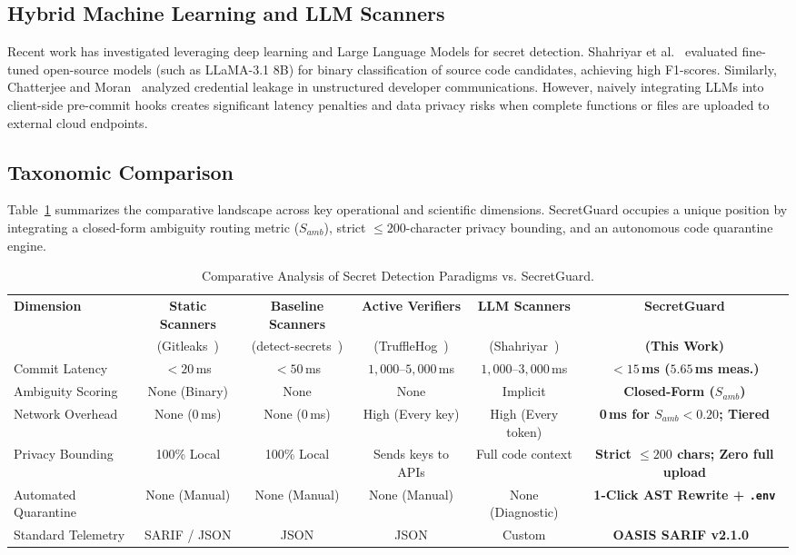 \subsection{Hybrid Machine Learning and LLM Scanners}
Recent work has investigated leveraging deep learning and Large Language Models for secret detection. Shahriyar et al.~\cite{shahriyar2025secret} evaluated fine-tuned open-source models (such as LLaMA-3.1 8B) for binary classification of source code candidates, achieving high F1-scores. Similarly, Chatterjee and Moran~\cite{chatterjee2024secretleak} analyzed credential leakage in unstructured developer communications. However, naively integrating LLMs into client-side pre-commit hooks creates significant latency penalties and data privacy risks when complete functions or files are uploaded to external cloud endpoints.

\subsection{Taxonomic Comparison}
Table~\ref{tab:comparison} summarizes the comparative landscape across key operational and scientific dimensions. SecretGuard occupies a unique position by integrating a closed-form ambiguity routing metric ($S_{amb}$), strict $\le 200$-character privacy bounding, and an autonomous code quarantine engine.

\begin{table}[t]
\centering
\caption{Comparative Analysis of Secret Detection Paradigms vs. SecretGuard.}
\label{tab:comparison}
\small
\begin{tabular}{lccccc}
\toprule
\textbf{Dimension} & \textbf{Static Scanners} & \textbf{Baseline Scanners} & \textbf{Active Verifiers} & \textbf{LLM Scanners} & \textbf{SecretGuard} \\
& (Gitleaks~\cite{rice2018gitleaks}) & (detect-secrets~\cite{yelp2019detectsecrets}) & (TruffleHog~\cite{ayrey2016trufflehog}) & (Shahriyar~\cite{shahriyar2025secret}) & \textbf{(This Work)} \\
\midrule
Commit Latency & $< 20$\,ms & $< 50$\,ms & $1,000$--$5,000$\,ms & $1,000$--$3,000$\,ms & \textbf{$< 15$\,ms ($5.65$\,ms meas.)} \\
Ambiguity Scoring & None (Binary) & None & None & Implicit & \textbf{Closed-Form ($S_{amb}$)} \\
Network Overhead & None (0\,ms) & None (0\,ms) & High (Every key) & High (Every token) & \textbf{0\,ms for $S_{amb} < 0.20$; Tiered} \\
Privacy Bounding & 100\% Local & 100\% Local & Sends keys to APIs & Full code context & \textbf{Strict $\le 200$ chars; Zero full upload} \\
Automated Quarantine & None (Manual) & None (Manual) & None (Manual) & None (Diagnostic) & \textbf{1-Click AST Rewrite + \texttt{.env}} \\
Standard Telemetry & SARIF / JSON & JSON & JSON & Custom & \textbf{OASIS SARIF v2.1.0~\cite{oasis2020sarif}} \\
\bottomrule
\end{tabular}
\end{table}
